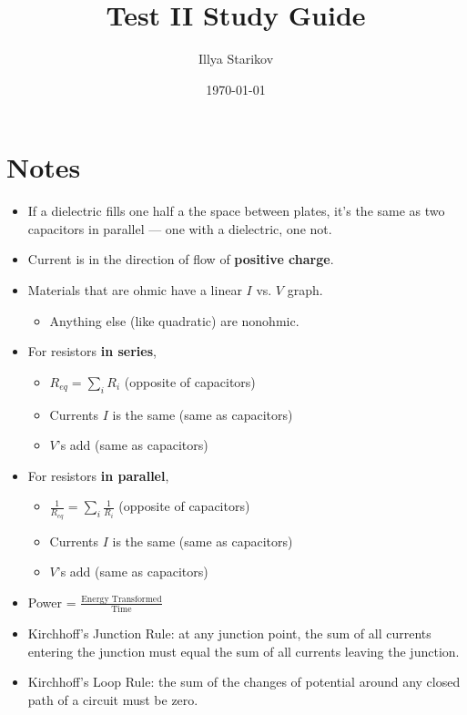 \documentclass[12pt]{article}
\title{Test II Study Guide}
\date{\today}
\author{Illya Starikov}
\begin{document}
\maketitle

\section{Notes}
\begin{itemize}
    \item If a dielectric fills one half a the space between plates, it's the same as two capacitors in parallel --- one with a dielectric, one not.
    \item Current is in the direction of flow of \textbf{positive charge}.
    \item Materials that are ohmic have a linear $I$ vs. $V$ graph.
    \begin{itemize}
        \item Anything else (like quadratic) are nonohmic.
    \end{itemize}

    \item For resistors \textbf{in series},
    \begin{itemize}
        \item $R_{eq} = \sum _i R_i$ (opposite of capacitors)
        \item Currents $I$ is the same (same as capacitors)
        \item $V$'s add (same as capacitors)
    \end{itemize}

    \item For resistors \textbf{in parallel},
    \begin{itemize}
        \item $\frac{1}{R_{eq}} = \sum _i \frac{1}{R_i}$ (opposite of capacitors)
        \item Currents $I$ is the same (same as capacitors)
        \item $V$'s add (same as capacitors)
    \end{itemize}

    \item Power = $\frac{\text{Energy Transformed}}{\text{Time}}$
    \item Kirchhoff’s Junction Rule: at any junction point, the sum of all currents entering the junction must equal the sum of all currents leaving the junction.
    \item Kirchhoff’s Loop Rule: the sum of the changes of potential around any closed path of a circuit must be zero.
\end{itemize}
\end{document}
